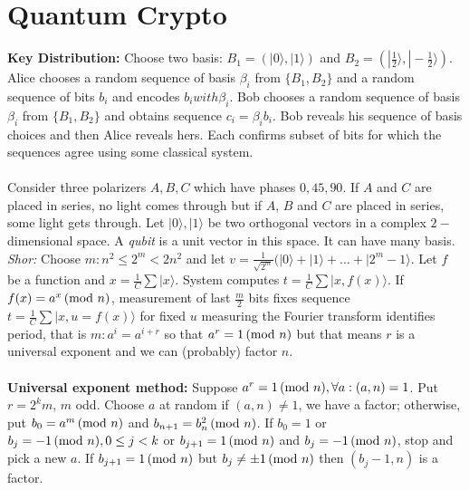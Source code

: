\section{Quantum Crypto}
{\bf Key Distribution:} Choose two basis: 
$B_1= ( |0 \rangle, |1 \rangle)$ and
$B_2= ( |{\frac 1 2} \rangle, |-{\frac 1 2} \rangle)$.  
Alice chooses a random sequence 
of basis $\beta_i$ from
$\{B_1 , B_2 \}$ and a random sequence of bits $b_i$ and encodes $b_i with \beta_i$.
Bob chooses a random sequence 
of basis $\beta_i$ from
$\{B_1 , B_2 \}$ and obtains sequence $c_i= \beta_i b_i$.  Bob reveals his sequence of
basis choices and then Alice reveals hers.  Each confirms subset of bits for which the
sequences agree using some classical system.
\\
\\
Consider three polarizers $A, B, C$ which have phases $0, 45, 90$.  If
$A$ and $C$ are placed in series, no light comes through but if
$A$, $B$ and $C$ are placed in series, some light gets through.
Let $|0 \rangle, |1 \rangle$ be two orthogonal vectors in a complex $2-$dimensional space.
A \emph{qubit} is a unit vector in this space.  It can have many basis.
\emph{Shor:}  Choose $m: n^2 \le 2^m <2 n^2$ and let 
$v= {\frac {1} {\sqrt {2^m}}} (|0 \rangle + |1 \rangle + \ldots + |2^m-1 \rangle$.  
Let $f$ be a function
and $x= {\frac 1 C} \sum |x \rangle$.   System computes
$t= {\frac 1 C} \sum |x, f(x) \rangle$.  If $f(x)= a^x \thinspace \textnormal{(mod } n \textnormal{)}$, measurement of
last ${\frac m 2}$ bits fixes sequence
$t= {\frac 1 C} \sum |x, u=f(x) \rangle$ for fixed $u$ measuring the Fourier transform
identifies period, that is $m: a^{i} = a^{i+r}$ so that $a^r= 1\thinspace \textnormal{(mod } n \textnormal{)}$ but
that means $r$ is a universal exponent and we can (probably) factor $n$.
\\
\\
{\bf Universal exponent method:}  Suppose $a^r=1 \thinspace \textnormal{(mod } n \textnormal{)}, \forall a: (a,n)=1$.  Put
$r=2^km$, $m$ odd.  Choose $a$ at random if $(a,n) \ne 1$, we have a factor;
otherwise, put $b_0=a^m \thinspace \textnormal{(mod } n \textnormal{)}$ and $b_{n+1}= b_n^2 \thinspace \textnormal{(mod } n \textnormal{)}$.  If $b_0= 1$
or $b_j= -1 \thinspace \textnormal{(mod } n \textnormal{)}, 0 \le j < k$ or
$b_{j+1}=1 \thinspace \textnormal{(mod } n \textnormal{)}$ and $b_{j}=-1 \thinspace \textnormal{(mod } n \textnormal{)}$, stop and
pick a new $a$.  If 
$b_{j+1}=1 \thinspace \textnormal{(mod } n \textnormal{)}$ but $b_{j} \ne \pm 1 \thinspace \textnormal{(mod } n \textnormal{)}$ then $(b_j-1,n)$ is a factor.
